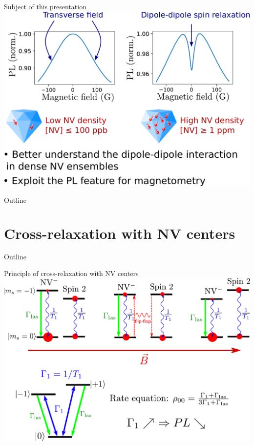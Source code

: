 \documentclass{beamer}
\begin{document}
\begin{frame}{Subject of this presentation}
\centering
\includegraphics[width=\textwidth,height=0.9\textheight,keepaspectratio]{slide_presentation_sujet}
\end{frame}

\begin{frame}{Outline}
\tableofcontents
\end{frame}



\section{Cross-relaxation with NV centers}
\begin{frame}{Outline}
\tableofcontents[currentsection]
\end{frame}
\begin{frame}{Principle of cross-relaxation with NV centers}
\centering
\includegraphics[width=\textwidth,height=0.8\textheight,keepaspectratio]{Slide_CR_presentation}
\end{frame}
\end{document}
